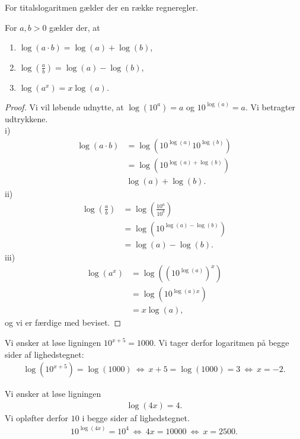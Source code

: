 For titalslogaritmen gælder der en række regneregler. 
\begin{setn}[Logaritmeregneregler]
	For $a,b>0$ gælder der, at
	\begin{enumerate}[label=\roman*)]
		\item $\log(a\cdot b) = \log(a)+ \log(b)$,
		\item $\log\left(\frac{a}{b}\right) = \log(a)-\log(b)$,
		\item $\log(a^x) = x\log(a).$
	\end{enumerate}		
\end{setn}
\begin{proof}
	Vi vil løbende udnytte, at $\log(10^a) = a$ og $10^{\log(a)} = a$. Vi betragter udtrykkene.
	\\
	i)
	\begin{align*}
		\log(a\cdot b) &= \log(10^{\log(a)}10^{\log(b)}) \\
		&= \log(10^{\log(a)+\log(b)})\\
		&\log(a) + \log(b).
	\end{align*}
	ii)
	\begin{align*}
		\log\left(\frac{a}{b}\right) &= \log\left(\frac{10^a}{10^b}\right)\\
		&= \log(10^{\log(a)-\log(b)})\\
		&= \log(a)-\log(b).
	\end{align*}
	iii)
	\begin{align*}
		\log(a^x) &= \log\left( \left(10^{\log(a)}\right)^x\right)\\
		&= \log\left(10^{\log(a)x}\right)\\
		&= x\log(a),
    \end{align*}		
    og vi er færdige med beviset. 
\end{proof}

\begin{exa}
	Vi ønsker at løse ligningen $10^{x+5} = 1000$. Vi tager derfor logaritmen på begge sider af lighedstegnet:
	\begin{align*}
		\log\left(10^{x+5}\right) = \log(1000) \ \Leftrightarrow \ x+5 = \log(1000) = 3 \ \Leftrightarrow	\ x = -2.
	\end{align*}	 
\end{exa}
\begin{exa}
	Vi ønsker at løse ligningen 
	\begin{align*}
		\log(4x) = 4. 
	\end{align*}
	Vi opløfter derfor $10$ i begge sider af lighedstegnet.
	\begin{align*}
		10^{\log(4x)} = 10^4 \ \Leftrightarrow \ 4x = 10000 \ \Leftrightarrow	\ x = 2500.
	\end{align*}
\end{exa}

